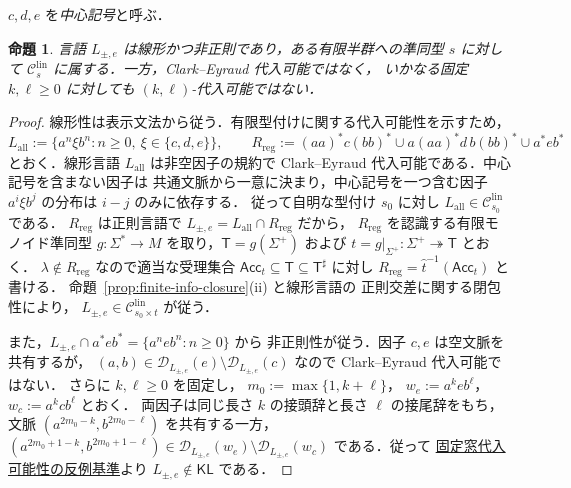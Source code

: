 \documentclass[11pt,a4paper]{ltjsarticle}
\newtheorem{proposition}[theorem]{命題}
\theoremstyle{remark}
\theoremstyle{plain}
\newcommand{\D}{\mathcal{D}}
\newcommand{\lin}{\mathrm{lin}}
\newcommand{\Clin}[1]{\mathcal C_{#1}^{\lin}}
\begin{document}
$c,d,e$ を\emph{中心記号}と呼ぶ．

\begin{proposition}\label{prop:linear-separator-example}
言語 $L_{\pm,e}$ は線形かつ非正則であり，ある有限半群への準同型
$s$ に対して $\Clin{s}$ に属する．一方，Clark--Eyraud 代入可能ではなく，
いかなる固定 $k,\ell\ge0$ に対しても $(k,\ell)$-代入可能ではない．
\end{proposition}

\begin{proof}
線形性は表示文法から従う．有限型付けに関する代入可能性を示すため，
\[
 L_{\mathrm{all}}:=\{a^n\xi b^n:n\ge0,\ \xi\in\{c,d,e\}\},\qquad
 R_{\mathrm{reg}}:=(aa)^*c(bb)^*\cup a(aa)^*d\,b(bb)^*\cup a^*eb^*
\]
とおく．線形言語 $L_{\mathrm{all}}$ は非空因子の規約で
Clark--Eyraud 代入可能である．中心記号を含まない因子は
共通文脈から一意に決まり，中心記号を一つ含む因子
$a^i\xi b^j$ の分布は $i-j$ のみに依存する．
従って自明な型付け $s_0$ に対し
$L_{\mathrm{all}}\in\Clin{s_0}$ である．
$R_{\mathrm{reg}}$ は正則言語で $L_{\pm,e}=L_{\mathrm{all}}\cap R_{\mathrm{reg}}$ だから，
$R_{\mathrm{reg}}$ を認識する有限モノイド準同型
$g:\Sigma^*\to M$ を取り，$\mathsf T=g(\Sigma^+)$ および
$t=g|_{\Sigma^+}:\Sigma^+\twoheadrightarrow\mathsf T$ とおく．
$\lambda\notin R_{\mathrm{reg}}$ なので適当な受理集合
$\mathsf{Acc}_t\subseteq\mathsf T\subseteq\mathsf T^\sharp$ に対し
$R_{\mathrm{reg}}=\widehat t^{-1}(\mathsf{Acc}_t)$ と書ける．
命題~\ref{prop:finite-info-closure}(ii) と線形言語の
正則交差に関する閉包性により，
$L_{\pm,e}\in\Clin{s_0\times t}$ が従う．

また，$L_{\pm,e}\cap a^*eb^*=\{a^neb^n:n\ge0\}$ から
非正則性が従う．因子 $c,e$ は空文脈を共有するが，
$(a,b)\in\D_{L_{\pm,e}}(e)\setminus\D_{L_{\pm,e}}(c)$
なので Clark--Eyraud 代入可能ではない．
さらに $k,\ell\ge0$ を固定し，
$m_0:=\max\{1,k+\ell\}$，
$w_e:=a^keb^\ell$，$w_c:=a^kcb^\ell$ とおく．
両因子は同じ長さ $k$ の接頭辞と長さ $\ell$ の接尾辞をもち，
文脈 $(a^{2m_0-k},b^{2m_0-\ell})$ を共有する一方，
$(a^{2m_0+1-k},b^{2m_0+1-\ell})
\in\D_{L_{\pm,e}}(w_e)\setminus\D_{L_{\pm,e}}(w_c)$
である．従って
\hyperref[crit:kl]{固定窓代入可能性の反例基準}より
$L_{\pm,e}\notin\mathsf{KL}$ である．
\end{proof}
\end{document}
